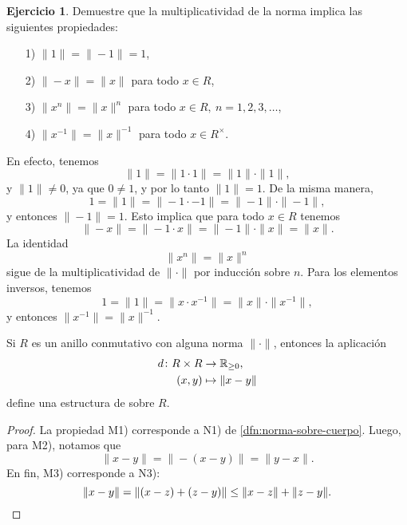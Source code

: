 \documentclass{article}
\numberwithin{equation}{section}
\theoremstyle{definition}
\newtheorem{ejerc}{Ejercicio}
\begin{document}
\begin{ejerc}
  Demuestre que la multiplicatividad de la norma implica las siguientes
  propiedades:

  \begin{enumerate}
  \item[1)] $\|1\| = \|-1\| = 1$,

  \item[2)] $\|-x\| = \|x\|$ para todo $x\in R$,

  \item[3)] $\|x^n\| = \|x\|^n$ para todo $x\in R, ~ n = 1,2,3,\ldots$,

  \item[4)] $\|x^{-1}\| = \|x\|^{-1}$ para todo $x\in R^\times$.
  \end{enumerate}

  \ifdefined\solutions\begin{solucion}
    En efecto, tenemos
    $$\|1\| = \|1\cdot 1\| = \|1\|\cdot \|1\|,$$
    y $\|1\| \ne 0$, ya que $0\ne 1$, y por lo tanto $\|1\| = 1$. De la misma
    manera,
    $$1 = \|1\| = \|-1\cdot -1\| = \|-1\|\cdot \|-1\|,$$
    y entonces $\|-1\| = 1$. Esto implica que para todo $x\in R$ tenemos
    $$\|-x\| = \|-1\cdot x\| = \|-1\|\cdot \|x\| = \|x\|.$$
    La identidad
    $$\|x^n\| = \|x\|^n$$
    sigue de la multiplicatividad de $\|\cdot\|$ por inducción sobre $n$. Para
    los elementos inversos, tenemos
    $$1 = \|1\| = \|x\cdot x^{-1}\| = \|x\|\cdot \|x^{-1}\|,$$
    y entonces $\|x^{-1}\| =  \|x\|^{-1}$.
  \end{solucion}\fi
\end{ejerc}

\begin{observacion}
  Si $R$ es un anillo conmutativo con alguna norma $\|\cdot\|$, entonces
  la aplicación
  \begin{align*}
    d\colon R\times R & \to \mathbb{R}_{\ge 0},\\
    (x,y) & \mapsto \|x-y\|
  \end{align*}
  define una estructura de  sobre $R$.

  \begin{proof}
    La propiedad M1) corresponde a N1) de \ref{dfn:norma-sobre-cuerpo}. Luego,
    para M2), notamos que
    $$\|x-y\| = \|-(x-y)\| = \|y-x\|.$$
    En fin, M3) corresponde a N3):
    \[ \|x-y\| = \|(x-z) + (z-y)\| \le \|x-z\| + \|z-y\|. \qedhere \]
  \end{proof}
\end{observacion}
\end{document}
